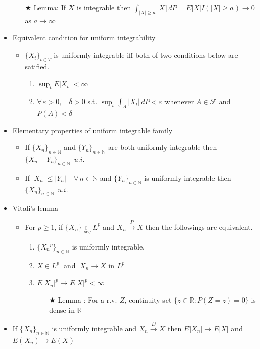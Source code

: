 \documentclass[12pt, A4]{article}
\newcommand{\trick}{$\bigstar$}
\newcommand{\N}{\mathbb{N}}
\newcommand{\R}{\mathbb{R}}
\newcommand{\F}{\mathcal{F}}
\newcommand{\seq}{\underset{seq}{\subset}}
\newcommand{\exist}{\exists\,}
\newcommand{\convp}{\overset{P}{\rightarrow}}
\newcommand{\convd}{\overset{D}{\rightarrow}}
\newcommand{\foranyn}{\quad \forall \, n\in \N}
\begin{document}
\begin{itemize}
\begin{itemize}
		\item[\trick] Lemma: If $X$ is integrable then $\int_{|X|\geq a} |X|\,dP=E|X|I(|X|\geq a)\rightarrow 0$ as $a\rightarrow \infty$
	\end{itemize}
	\item Equivalent condition for uniform integrability
	\begin{itemize}
		\item $\{X_t\}_{t\in T}$ is uniformly integrable iff both of two conditions below are satified. 
		\begin{enumerate}
			\item $\sup_t E|X_t|<\infty$
			\item $\forall \, \varepsilon>0,\, \exist \delta>0$  s.t. $\sup_t\int_A|X_t|\, dP<\varepsilon$ whenever $A\in \F$ and $P(A)<\delta$
		\end{enumerate}
	\end{itemize}
	\item Elementary properties of uniform integrable family
	\begin{itemize}
		\item If $\{X_n\}_{n\in \N}$ and $\{Y_n\}_{n\in \N}$ are both uniformly integrable then $\{X_n+Y_n\}_{n\in \N}\;\,u.i.$ 
		\item If $|X_n|\leq |Y_n| \foranyn$ and $\{Y_n\}_{n\in \N}$ is uniformly integrable then $\{X_n\}_{n\in \N}\;\, u.i.$
	\end{itemize} 
	\item Vitali's lemma
	\begin{itemize}
		\item For $p\geq 1$, if $\{X_n\}\seq L^p$ and $X_n\convp X$ then the followings are equivalent.
		\begin{enumerate}
			\item $\{{X_n}^p\}_{n\in \N}$ is uniformly integrable.
			\item $X\in L^p\;$ and $\;X_n\rightarrow X$ in $L^p$
			\item $E|X_n|^p\rightarrow E|X|^p<\infty$
			\begin{itemize}
				\item[\trick] Lemma : For a r.v. $Z$, continuity set $\{z\in \R : P(Z=z)=0\}$ is dense in $\R$
			\end{itemize}
		\end{enumerate}
	\end{itemize}
	\item If $\{X_n\}_{n\in \N}$ is uniformly integrable and $X_n\convd X$ then $E|X_n|\rightarrow E|X|$ and $E(X_n)\rightarrow E(X)$

\end{itemize}
\end{document}
